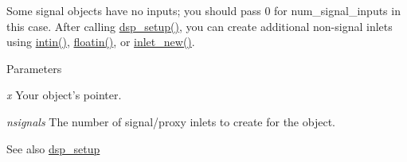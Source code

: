Some signal objects have no inputs; you should pass 0 for num\_\-signal\_\-inputs in this case. After calling \hyperlink{group__msp_gad15f054306792846a00a5f4e9e5426be}{dsp\_\-setup()}, you can create additional non-\/signal inlets using \hyperlink{group__inout_ga8ca68c8eafef51622f263f13e047341b}{intin()}, \hyperlink{group__inout_ga01125a22c75ef028199febbe21346f0e}{floatin()}, or \hyperlink{group__inout_ga7195144cee5e8b74c10c2b17b6c6472a}{inlet\_\-new()}.


\begin{DoxyParams}{Parameters}
\item[{\em x}]Your object's pointer. \item[{\em nsignals}]The number of signal/proxy inlets to create for the object. \end{DoxyParams}
\begin{DoxySeeAlso}{See also}
\hyperlink{group__msp_gad15f054306792846a00a5f4e9e5426be}{dsp\_\-setup} 
\end{DoxySeeAlso}
